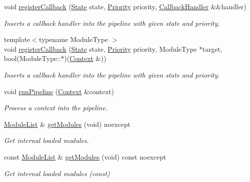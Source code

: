 \begin{DoxyCompactItemize}
void \mbox{\hyperlink{classo_z_1_1_pipeline_a869b02b2b8953993ccfb882a3e1f3a0f}{register\+Callback}} (\mbox{\hyperlink{namespaceo_z_a356b278f7c65def0cae75fca8cae268e}{State}} state, \mbox{\hyperlink{namespaceo_z_af05a92eb185d18369e9b4acdcd9dcd12}{Priority}} priority, \mbox{\hyperlink{classo_z_1_1_pipeline_a5a71ea2f2d4be5b82589c1b8175722f4}{Callback\+Handler}} \&\&handler)
\begin{DoxyCompactList}\small\item\em Inserts a callback handler into the pipeline with given state and priority. \end{DoxyCompactList}\item 
{\footnotesize template$<$typename Module\+Type $>$ }\\void \mbox{\hyperlink{classo_z_1_1_pipeline_af6d96b2697aa6770a3f1dd205b12c1c3}{register\+Callback}} (\mbox{\hyperlink{namespaceo_z_a356b278f7c65def0cae75fca8cae268e}{State}} state, \mbox{\hyperlink{namespaceo_z_af05a92eb185d18369e9b4acdcd9dcd12}{Priority}} priority, Module\+Type $\ast$target, bool(Module\+Type\+::$\ast$)(\mbox{\hyperlink{classo_z_1_1_context}{Context}} \&))
\begin{DoxyCompactList}\small\item\em Inserts a callback handler into the pipeline with given state and priority. \end{DoxyCompactList}\item 
void \mbox{\hyperlink{classo_z_1_1_pipeline_a90bddc5511acce66f2aa780c3bba29b4}{run\+Pipeline}} (\mbox{\hyperlink{classo_z_1_1_context}{Context}} \&context)
\begin{DoxyCompactList}\small\item\em Process a context into the pipeline. \end{DoxyCompactList}\item 
\mbox{\hyperlink{classo_z_1_1_pipeline_a3bb478d291a83763b269d8d27e186a47}{Module\+List}} \& \mbox{\hyperlink{classo_z_1_1_pipeline_a3886c29b903d2e359a853ea76711661b}{get\+Modules}} (void) noexcept
\begin{DoxyCompactList}\small\item\em Get internal loaded modules. \end{DoxyCompactList}\item 
const \mbox{\hyperlink{classo_z_1_1_pipeline_a3bb478d291a83763b269d8d27e186a47}{Module\+List}} \& \mbox{\hyperlink{classo_z_1_1_pipeline_a84358c4166a67aabc0d5811608727da9}{get\+Modules}} (void) const noexcept
\begin{DoxyCompactList}\small\item\em Get internal loaded modules (const) \end{DoxyCompactList}\item 

\end{DoxyCompactItemize}
